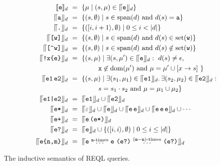 \begin{table}
	\begin{align*}
		\llbracket\texttt{e}\rrbracket_{d} & \ = \  \{ \mu \mid (s, \mu) \in \llceil{\texttt{e}}\rrfloor_{d} \}\\
		\llceil{\texttt{a}}\rrfloor_{d} & \ = \  \{ (s, \emptyset) \mid s \in \text{span}(d) \text{ and } d(s) = \texttt{a} \}\\
		\llceil{\texttt{.}}\rrfloor_{d} & \ = \  \{ ([i,i+1\rangle, \emptyset) \mid 0 \leq i < |d| \}\\
		\llceil{\texttt{[w]}}\rrfloor_{d} & \ = \  \{ (s, \emptyset) \mid s \in \text{span}(d) \text{ and } d(s) \in  \text{set}(\texttt{w}) \}\\
		\llceil{\texttt{[\textasciicircum w]}}\rrfloor_{d} & \ = \  \{ (s, \emptyset) \mid s \in \text{span}(d) \text{ and } d(s) \notin  \text{set}(\texttt{w}) \}\\
		\llceil{\texttt{!x\{e\}}}\rrfloor_{d} & \ = \  \{ (s, \mu) \mid \exists (s, \mu') \in \llceil{\texttt{e}}\rrfloor_{d}: \ d(s) \neq \epsilon, 
		\\
		& \;\;\;\;\;\;\;\;\;\;\;\;\;\;\;\; \texttt{x} \not\in \text{dom}(\mu') \text{ and }
		\mu =  \mu'  \cup [x \to s] \ \}
		\\
		\llceil{\texttt{e1} \, \texttt{e2}}\rrfloor_{d} & \ = \  \{ (s, \mu) \mid
		\exists (s_1, \mu_1) \in \llceil{\texttt{e1}}\rrfloor_{d}. \,\exists (s_2, \mu_2) \in \llceil{\texttt{e2}}\rrfloor_{d}: \\
		& \;\;\;\;\;\;\;\;\;\;\;\;\;\;\;\; s = s_1 \cdot s_2 \text{ and } \mu = \mu_1 \cup \mu_2 \}\\
		\llceil{\texttt{e1|e2}}\rrfloor_{d} & \ = \  \llceil{\texttt{e1}}\rrfloor_{d} \cup \llceil{\texttt{e2}}\rrfloor_{d}\\
		\llceil{\texttt{e*}}\rrfloor_{d} & \ = \  \llceil{\varepsilon}\rrfloor_{d} \cup \llceil{\texttt{e}}\rrfloor_{d} \cup \llceil{\texttt{e}\, \texttt{e}}\rrfloor_{d} \cup
		\llceil{\texttt{e}\, \texttt{e}\,  \texttt{e}}\rrfloor_{d} \cup \cdots \\
		\llceil{\texttt{e+}}\rrfloor_{d} & \ = \  \llceil{\texttt{e}\, \texttt{(e*)}}\rrfloor_{d} \\
		\llceil{\texttt{e?}}\rrfloor_{d} & \ = \  \llceil{\texttt{e}}\rrfloor_{d} \cup \{ ([i,i\rangle, \emptyset) \mid 0 \leq i \leq |d| \}\\
		\llceil{\texttt{e\{n,m\}}}\rrfloor_{d} & \ = \  \llceil{\texttt{e} \ \overset{\texttt{n}\text{-times}}{\ldots } \ \texttt{e} \  \texttt{(e?)} \ \overset{(\texttt{m}-\texttt{n})\text{-times}}{\ldots } \  \texttt{(e?)}}\rrfloor_{d}
	\end{align*}
	\vspace*{-10pt}
	\caption{The inductive semantics of REQL queries.}
	\label{tab-semantics}	
	\vspace{-5mm}
\end{table}

